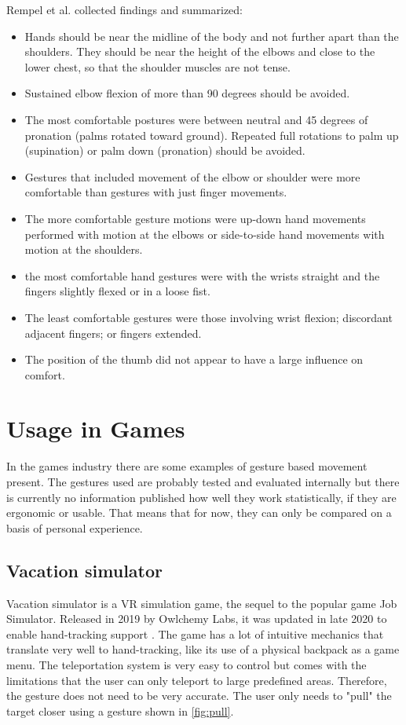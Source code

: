 Rempel et al. \cite{Rempel2014} collected findings and summarized:
\begin{itemize}
  \item Hands should be near the midline of the body and not further apart than the shoulders. They should be near the height of the elbows and close to the lower chest, so that the shoulder muscles are not tense. 
  \item Sustained elbow flexion of more than 90 degrees should be avoided.
  \item The most comfortable postures were between neutral and 45 degrees of pronation (palms rotated toward ground). Repeated full rotations to palm up (supination) or palm down (pronation) should be avoided.
  \item Gestures that included movement of the elbow or shoulder were more comfortable than gestures with just finger movements.
  \item The more comfortable gesture motions were up-down hand movements performed with motion at the elbows or side-to-side hand movements with motion at the shoulders. 
  \item the most comfortable hand gestures were with the wrists straight and the fingers slightly flexed or in a loose fist.
  \item The least comfortable gestures were those involving wrist flexion; discordant adjacent fingers; or fingers extended.
  \item The position of the thumb did not appear to have a large influence on comfort.
\end{itemize}



\section{Usage in Games}
In the games industry there are some examples of gesture based movement present. The gestures used are probably tested and evaluated internally but there is currently no information published how well they work statistically, if they are ergonomic or usable. That means that for now, they can only be compared on a basis of personal experience. 


\subsection{Vacation simulator}
Vacation simulator \cite{VacSimOculus} is a VR simulation game, the sequel to the popular game Job Simulator. Released in 2019 by Owlchemy Labs, it was updated in late 2020 to enable hand-tracking support \cite{VacSimBlog}. The game has a lot of intuitive mechanics that translate very well to hand-tracking, like its use of a physical backpack as a game menu. The teleportation system is very easy to control but comes with the limitations that the user can only teleport to large predefined areas. Therefore, the gesture does not need to be very accurate. The user only needs to "pull" the target closer using a gesture shown in \ref{fig:pull}. 

